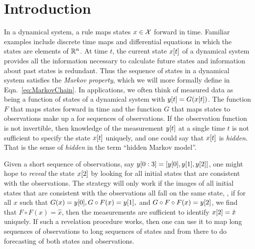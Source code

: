 

\chapter{Introduction}
\label{chap:introduction}

In a dynamical system, a rule maps states $x\in\cal X$ forward in
time.  Familiar examples include discrete time maps
and differential equations
in which the states are elements of $\mathbb{R}^n$.  At time $t$, the
current state ${x}{[t]}$ of a dynamical system provides all the
information necessary to calculate future states and information about
past states is redundant.  Thus the sequence of states in a dynamical
system satisfies the \emph{Markov property}, which we will more
formally define in Eqn.~\eqref{eq:MarkovChain}.  In applications, we
often think of measured data as being a function of states of a
dynamical system with $ {y}{[t]} = G({x}{[t]})$.  The function $F$
that maps states forward in time and the function $G$ that maps states
to observations make up a \emph{} for
sequences of observations.  If the observation function is not
invertible, then knowledge of the measurement ${y}{[t]}$ at a single
time $t$ is not sufficient to specify the state ${x}{[t]}$ uniquely,
and one could say that ${x}{[t]}$ is \emph{hidden}.  That is the
sense of \emph{hidden} in the term ``hidden Markov model''.

Given a short sequence of observations, say
$y[0:3] = \left[ {y}{[0]},{y}{[1]}, {y}{[2]}\right]$, one
might hope to \emph{reveal} the state ${x}{[2]}$ by looking for all
initial states that are consistent with the observations.  The
strategy will only work if the images of all initial states that are
consistent with the observations all fall on the same state, \ie, if
for all $x$ such that $ G(x) = {y}{[0]}, G\circ F(x) = {y}{[1]},$
and $G\circ F\circ F(x) = {y}{[2]}$, we find that
$F\circ F(x) = \hat x$, then the measurements are sufficient to
identify ${x}{[2]} = \hat x$ uniquely.  If such a revelation
procedure works, then one can use it to map long sequences of
observations to long sequences of states and from there to do
forecasting of both states and observations.

